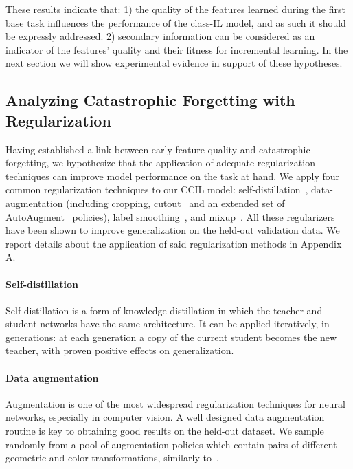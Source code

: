 \documentclass[final]{cvpr}
\begin{document}
These results indicate that: 
1) the quality of the features learned during the first base task influences the performance of the class-IL model, and as such it should be expressly addressed.
2) secondary information can be considered as an indicator of the features' quality and their fitness for incremental learning.
In the next section we will show experimental evidence in support of these hypotheses.














\subsection{Analyzing Catastrophic Forgetting with Regularization}
\label{sec:regularization}
Having established a link between early feature quality and catastrophic forgetting, we hypothesize that the application of adequate regularization techniques can improve model performance on the task at hand. We apply four common regularization techniques to our CCIL model: self-distillation~\cite{bornagain_nn}, data-augmentation (including cropping, cutout~\cite{cutout} and an extended set of AutoAugment~\cite{Cubuk_2019_CVPR} policies), label smoothing~\cite{label_smoothing}, and mixup~\cite{mixup}. All these regularizers have been shown to improve generalization on the held-out validation data. We report details about the application of said regularization methods in Appendix A.

\paragraph{Self-distillation}
Self-distillation \cite{bornagain_nn, sd_hilbert} is a form of knowledge distillation in which the teacher and student networks have the same architecture. It can be applied iteratively, in generations: at each generation a copy of the current student becomes the new teacher, with proven positive effects on generalization.


\paragraph{Data augmentation}
Augmentation is one of the most widespread regularization techniques for neural networks, especially in computer vision. A well designed data augmentation routine is key to obtaining good results on the held-out dataset. We sample randomly from a pool of augmentation policies which contain pairs of different geometric and color transformations, similarly to~\cite{Cubuk_2019_CVPR}.
\end{document}
